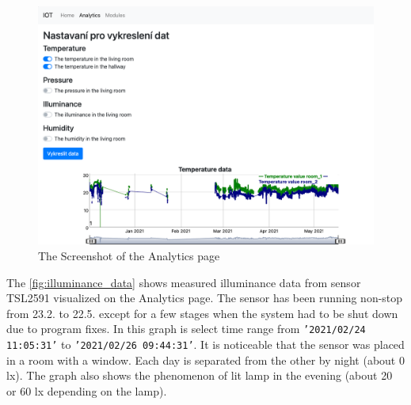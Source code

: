 

\begin{figure}[H]
    \centering
    \includegraphics[width=\textwidth]{img/web_analytics.png}
    \caption{The Screenshot of the Analytics page}
    \label{fig:screenshot_analytics_graph}
\end{figure}

The \cref{fig:illuminance_data} shows measured illuminance data from sensor TSL2591 visualized on the Analytics page. The sensor has been running non-stop from 23.2. to 22.5. except for a few stages when the system had to be shut down due to program fixes. In this graph is select time range from \texttt{'2021/02/24 11:05:31'} to \texttt{'2021/02/26 09:44:31'}. It is noticeable that the sensor was placed in a room with a window. Each day is separated from the other by night (about 0 lx). The graph also shows the phenomenon of lit lamp in the evening (about 20 or 60 lx depending on the lamp).


